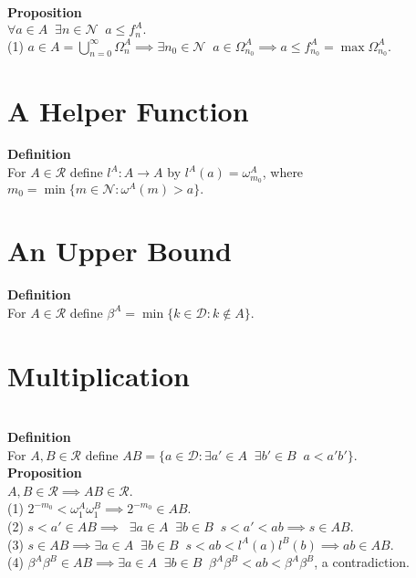 \documentclass{article}
\newcommand{\targetset}{ \mathscr{R}}
\newcommand{\sourceset}{ \mathscr{D}}
\newcommand{\naturals}{ \mathscr{N}}
\newcommand{\carpenter}{ \omega }
\newcommand{\leaper}{l}
\newcommand{\elt}{a}
\newcommand{\altelt}{s}
\newcommand{\umbrella}{\beta}
\newcommand{\interceptor}{\Omega}
\begin{document}
\textbf{Proposition}\\
$\forall a \in A \;\; \exists n \in \naturals \;\; a \le f^A_n.$\\ 

(1) $a \in A = \bigcup_{n = 0}^\infty \interceptor^A_n \implies \exists n_0 \in \naturals \;\; a \in \interceptor^A_{n_0} \implies a \le f^A_{n_0} = \max \interceptor^A_{n_0}$.\\

\section{A Helper Function}

\textbf{Definition}\\
For $A \in \targetset$ define $\leaper^A : A \to A$ by $\leaper^A(a) = \carpenter^A_{m_0}$, where $m_0 = \min \{ m \in \naturals : \carpenter^A(m) > a \}.$\\


\section{An Upper Bound}

\textbf{Definition}\\
For $A \in \targetset$ define $\umbrella^A= \min \{ k \in \sourceset : k \notin A \}.$\\ 

\section{Multiplication}\\

\textbf{Definition}\\
For $A, B \in \targetset$ define $AB = \{ \elt \in \sourceset : \exists a' \in A \;\; \exists b' \in B \;\; \elt < a'b' \}.$\\

\textbf{Proposition}\\
$A, B \in \targetset \implies AB \in \targetset$.\\ 

(1) $2^{-m_0} < \carpenter^A_1 \carpenter^B_1  \implies 2^{-m_0} \in AB$.\\
(2) $ \altelt < \elt' \in AB \implies \;\; \exists a \in A \;\; \exists b \in B \;\; \altelt < \elt' < ab \implies \altelt \in AB$.\\ 
(3) $\altelt \in AB \implies \exists a \in A \;\; \exists b \in B \;\; \altelt < ab  < \leaper^A(a) \leaper^B(b) \implies ab \in AB.$\\
(4) $\umbrella^A \umbrella^B \in AB \implies \exists a \in A \;\; \exists b \in B \;\; \umbrella^A \umbrella^B < ab < \umbrella^A \umbrella^B$, a contradiction. 
\end{document}
